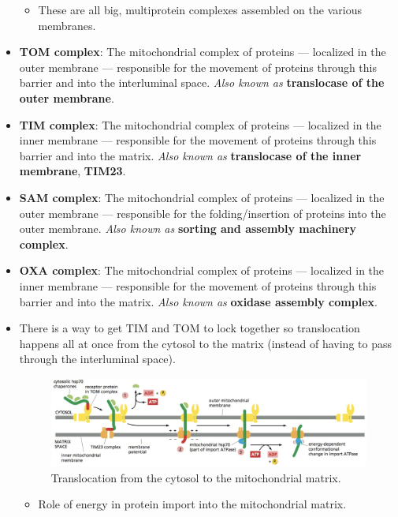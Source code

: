 \documentclass[../notes.tex]{subfiles}
\begin{document}
\begin{itemize}
\begin{figure}[h!]
        \label{fig:MiTranslocators}
    \end{figure}
    \begin{itemize}
        \item These are all big, multiprotein complexes assembled on the various membranes.
    \end{itemize}
    \item \textbf{TOM complex}: The mitochondrial complex of proteins --- localized in the outer membrane --- responsible for the movement of proteins through this barrier and into the interluminal space. \emph{Also known as} \textbf{translocase of the outer membrane}.
    \item \textbf{TIM complex}: The mitochondrial complex of proteins --- localized in the inner membrane --- responsible for the movement of proteins through this barrier and into the matrix. \emph{Also known as} \textbf{translocase of the inner membrane}, \textbf{TIM23}.
    \item \textbf{SAM complex}: The mitochondrial complex of proteins --- localized in the outer membrane --- responsible for the folding/insertion of proteins into the outer membrane. \emph{Also known as} \textbf{sorting and assembly machinery complex}.
    \item \textbf{OXA complex}: The mitochondrial complex of proteins --- localized in the inner membrane --- responsible for the movement of proteins through this barrier and into the matrix. \emph{Also known as} \textbf{oxidase assembly complex}.
    \item There is a way to get TIM and TOM to lock together so translocation happens all at once from the cytosol to the matrix (instead of having to pass through the interluminal space).
    \begin{figure}[H]
        \centering
        \includegraphics[width=0.97\linewidth]{../ExtFiles/MiTransCytMat.png}
        \caption{Translocation from the cytosol to the mitochondrial matrix.}
        \label{fig:MiTransCytMat}
    \end{figure}
    \begin{itemize}
        \item Role of energy in protein import into the mitochondrial matrix.

\end{itemize}
\end{itemize}
\end{document}
